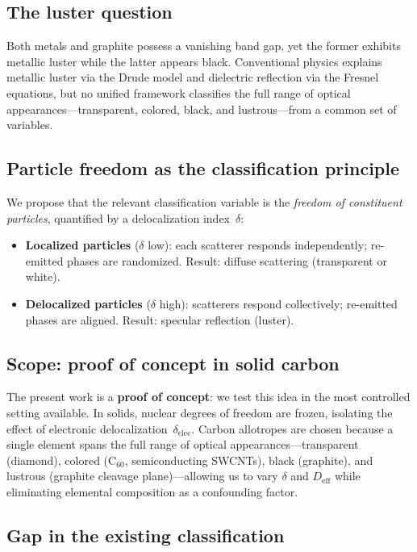 \documentclass[twocolumn,showpacs,preprintnumbers,amsmath,amssymb,prb]{revtex4-2}
\begin{document}
\subsection{The luster question}

Both metals and graphite possess a vanishing band gap, yet the former
exhibits metallic luster while the latter appears black.
Conventional physics explains metallic luster via the Drude model and
dielectric reflection via the Fresnel equations, but no unified framework
classifies the full range of optical appearances---transparent, colored,
black, and lustrous---from a common set of variables.

\subsection{Particle freedom as the classification principle}

We propose that the relevant classification variable is the
\emph{freedom of constituent particles}, quantified by
a delocalization index~$\delta$:

\begin{itemize}
  \item \textbf{Localized particles} ($\delta$ low): each scatterer
    responds independently; re-emitted phases are randomized.
    Result: diffuse scattering (transparent or white).
  \item \textbf{Delocalized particles} ($\delta$ high): scatterers
    respond collectively; re-emitted phases are aligned.
    Result: specular reflection (luster).
\end{itemize}

\subsection{Scope: proof of concept in solid carbon}

The present work is a \textbf{proof of concept}: we test this idea
in the most controlled setting available. In solids,
nuclear degrees of freedom are frozen, isolating the effect of
electronic delocalization~$\delta_\mathrm{elec}$.
Carbon allotropes are chosen because a single element spans the full
range of optical appearances---transparent (diamond), colored
(C$_{60}$, semiconducting SWCNTs), black (graphite), and lustrous
(graphite cleavage plane)---allowing us to vary $\delta$ and
$D_\mathrm{eff}$ while eliminating elemental composition as a
confounding factor.

\subsection{Gap in the existing classification}
\end{document}
